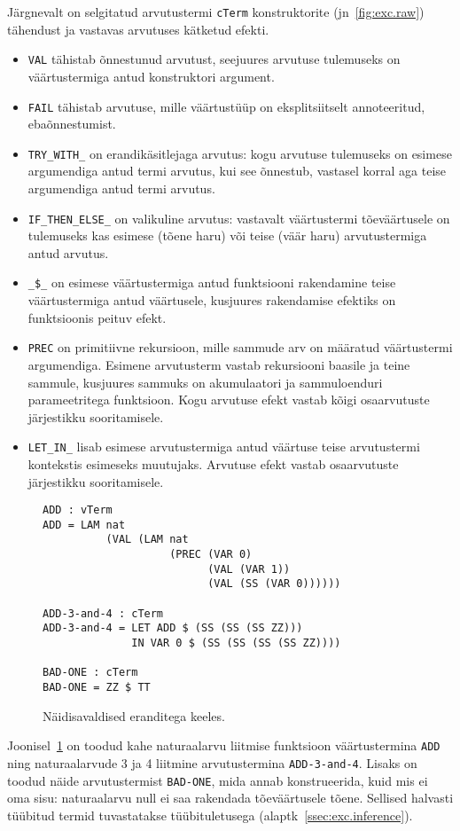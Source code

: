 \documentclass[a4paper,12pt]{article}
\begin{document}
Järgnevalt on selgitatud arvutustermi {\tt cTerm} konstruktorite (jn~\ref{fig:exc.raw}) tähendust ja vastavas arvutuses kätketud efekti.
\begin{itemize}
\item {\tt VAL} tähistab õnnestunud arvutust, seejuures arvutuse tulemuseks on väärtustermiga antud konstruktori argument.
\item {\tt FAIL} tähistab arvutuse, mille väärtustüüp on eksplitsiitselt annoteeritud, ebaõnnestumist.
\item {\tt TRY_WITH_} on erandikäsitlejaga arvutus: kogu arvutuse tulemuseks on esimese argumendiga antud termi arvutus, kui see õnnestub, vastasel korral aga teise argumendiga antud termi arvutus.
\item {\tt IF_THEN_ELSE_} on valikuline arvutus: vastavalt väärtustermi tõeväärtusele on tulemuseks kas esimese (tõene haru) või teise (väär haru) arvutustermiga antud arvutus.
\item {\tt _\$_} on esimese väärtustermiga antud funktsiooni rakendamine teise väärtustermiga antud väärtusele, kusjuures rakendamise efektiks on funktsioonis peituv efekt.
\item {\tt PREC} on primitiivne rekursioon, mille sammude arv on määratud väärtustermi argumendiga. Esimene arvutusterm vastab rekursiooni baasile ja teine sammule, kusjuures sammuks on akumulaatori ja sammuloenduri parameetritega funktsioon. Kogu arvutuse efekt vastab kõigi osaarvutuste järjestikku sooritamisele.
\item {\tt LET_IN_} lisab esimese arvutustermiga antud väärtuse teise arvutustermi kontekstis esimeseks muutujaks. Arvutuse efekt vastab osaarvutuste järjestikku sooritamisele.
\end{itemize}

\begin{figure}
  \begin{BVerbatim}
ADD : vTerm
ADD = LAM nat
          (VAL (LAM nat
                    (PREC (VAR 0)
                          (VAL (VAR 1))
                          (VAL (SS (VAR 0))))))

ADD-3-and-4 : cTerm
ADD-3-and-4 = LET ADD $ (SS (SS (SS ZZ)))
              IN VAR 0 $ (SS (SS (SS (SS ZZ))))

BAD-ONE : cTerm
BAD-ONE = ZZ $ TT
  \end{BVerbatim}
  \caption{Näidisavaldised eranditega keeles.}
  \label{fig:exc.raw.ex1}
\end{figure}

Joonisel~\ref{fig:exc.raw.ex1} on toodud kahe naturaalarvu liitmise funktsioon väärtustermina {\tt ADD}
ning naturaalarvude 3 ja 4 liitmine arvutustermina {\tt ADD-3-and-4}.
Lisaks on toodud näide arvutustermist {\tt BAD-ONE}, mida annab konstrueerida,
kuid mis ei oma sisu: naturaalarvu null ei saa rakendada tõeväärtusele tõene.
Sellised halvasti tüübitud termid tuvastatakse tüübituletusega (alaptk~\ref{ssec:exc.inference}).
\end{document}
